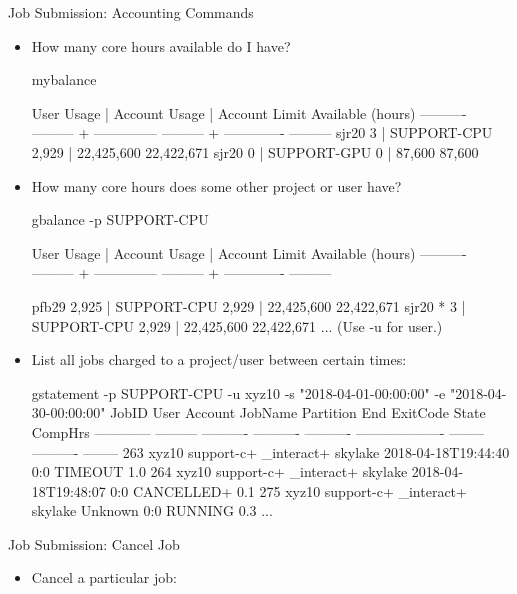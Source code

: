 \begin{frame}[fragile]{Job Submission: Accounting Commands}
\begin{itemize}
\item{How many core hours available do I have?}
\begin{semiverbatim}
\tiny
mybalance

User           Usage |        Account     Usage | Account Limit Available (hours)
---------- --------- + -------------- --------- + ------------- ---------
sjr20              3 |    SUPPORT-CPU     2,929 |    22,425,600 {\color{red}22,422,671}
sjr20              0 |    SUPPORT-GPU         0 |        87,600    {\color{red}87,600}
\end{semiverbatim}
\smallskip
\item{How many core hours does some other project or user have?}
\begin{semiverbatim}
\tiny
gbalance -p SUPPORT-CPU

User           Usage |        Account     Usage | Account Limit Available (hours)
---------- --------- + -------------- --------- + ------------- ---------

pfb29          2,925 |    SUPPORT-CPU     2,929 |    22,425,600 22,422,671
sjr20 *            3 |    SUPPORT-CPU     2,929 |    22,425,600 22,422,671
...
(Use -u for user.)
\end{semiverbatim}
\smallskip
\item{List all jobs charged to a project/user between certain times:}
\begin{semiverbatim}
\Tiny
gstatement -p SUPPORT-CPU  -u xyz10 -s "2018-04-01-00:00:00" -e "2018-04-30-00:00:00" 
       JobID      User    Account    JobName  Partition                 End ExitCode      State  CompHrs 
------------ --------- ---------- ---------- ---------- ------------------- -------- ---------- -------- 
263              xyz10 support-c+ _interact+    skylake 2018-04-18T19:44:40      0:0    TIMEOUT      1.0
264              xyz10 support-c+ _interact+    skylake 2018-04-18T19:48:07      0:0 CANCELLED+      0.1
275              xyz10 support-c+ _interact+    skylake             Unknown      0:0    RUNNING      0.3
...
\end{semiverbatim}
\end{itemize}
\end{frame}


\begin{frame}[fragile]{Job Submission: Cancel Job}
\begin{itemize}
\item{Cancel a particular job:}
\end{itemize}
\end{frame}


